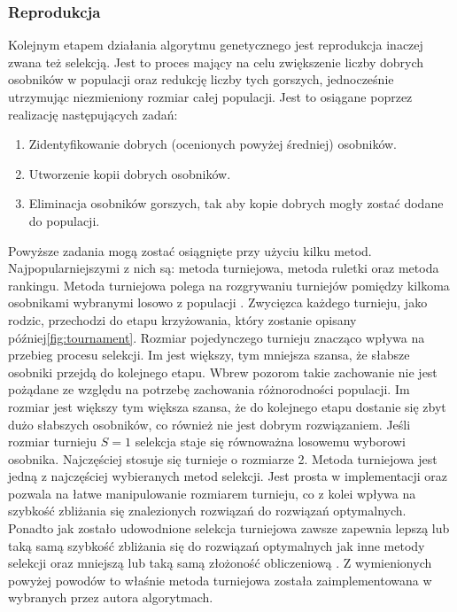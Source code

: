 \documentclass[twoside]{iisthesis}
\begin{document}
\subsubsection{Reprodukcja}
Kolejnym etapem działania algorytmu genetycznego jest reprodukcja inaczej zwana też selekcją. Jest to proces mający na celu zwiększenie liczby dobrych osobników w populacji oraz redukcję liczby tych gorszych, jednocześnie utrzymując niezmieniony rozmiar całej populacji. Jest to osiągane poprzez realizację następujących zadań:\\
\begin{enumerate}
	\item Zidentyfikowanie dobrych (ocenionych powyżej średniej) osobników.
	\item Utworzenie kopii dobrych osobników.
	\item Eliminacja osobników gorszych, tak aby kopie dobrych mogły zostać dodane do populacji.\cite{book}\\
\end{enumerate}
Powyższe zadania mogą zostać osiągnięte przy użyciu kilku metod. Najpopularniejszymi z nich są: metoda turniejowa, metoda ruletki oraz metoda rankingu.
Metoda turniejowa polega na rozgrywaniu turniejów pomiędzy kilkoma osobnikami wybranymi losowo z populacji \cite{tournament}. Zwycięzca każdego turnieju, jako rodzic, przechodzi do etapu krzyżowania, który zostanie opisany później\eqref{fig:tournament}. Rozmiar pojedynczego turnieju znacząco wpływa na przebieg procesu selekcji. Im jest większy, tym mniejsza szansa, że słabsze osobniki przejdą do kolejnego etapu. Wbrew pozorom takie zachowanie nie jest pożądane ze względu na potrzebę zachowania różnorodności populacji. Im rozmiar jest większy tym większa szansa, że do kolejnego etapu dostanie się zbyt dużo słabszych osobników, co również nie jest dobrym rozwiązaniem. Jeśli rozmiar turnieju $S = 1$ selekcja staje się równoważna losowemu wyborowi osobnika. Najczęściej stosuje się turnieje o rozmiarze 2. Metoda turniejowa jest jedną z najczęściej wybieranych metod selekcji. Jest prosta w implementacji oraz pozwala na łatwe manipulowanie rozmiarem turnieju, co z kolei wpływa na szybkość zbliżania się znalezionych rozwiązań do rozwiązań optymalnych. Ponadto jak zostało udowodnione selekcja turniejowa zawsze zapewnia lepszą lub taką samą szybkość zbliżania się do rozwiązań optymalnych jak inne metody selekcji oraz mniejszą lub taką samą złożoność obliczeniową \cite{book}. Z wymienionych powyżej powodów to właśnie metoda turniejowa została zaimplementowana w wybranych przez autora algorytmach.
\end{document}
